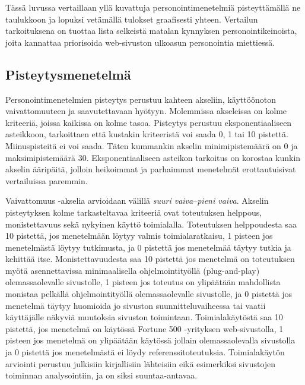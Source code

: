 \documentclass[finnish, 12pt, a4paper, elec, utf8, a-1b, online]{aaltothesis}
\begin{document}
Tässä luvussa vertaillaan yllä kuvattuja personointimenetelmiä pisteyttämällä ne
taulukkoon ja lopuksi vetämällä tulokset graafisesti yhteen. Vertailun
tarkoituksena on tuottaa lista selkeistä matalan kynnyksen personointikeinoista,
joita kannattaa priorisoida web-sivuston ulkoasun personointia miettiessä.

\subsection{Pisteytysmenetelmä}

Personointimenetelmien pisteytys perustuu kahteen akseliin, käyttöönoton
vaivattomuuteen ja saavutettavaan hyötyyn. Molemmissa akseleissa on kolme
kriteeriä, joissa kaikissa on kolme tasoa. Pisteytys perustuu eksponentiaaliseen
asteikkoon, tarkoittaen että kustakin kriteeristä voi saada 0, 1 tai 10
pistettä. Miinuspisteitä ei voi saada. Täten kummankin akselin minimipistemäärä
on 0 ja maksimipistemäärä 30. Eksponentiaaliseen asteikon tarkoitus on korostaa
kunkin akselin ääripäitä, jolloin heikoimmat ja parhaimmat menetelmät
erottautuisivat vertailuissa paremmin.

Vaivattomuus -akselia arvioidaan välillä \textit{suuri vaiva}--\textit{pieni
    vaiva}. Akselin pisteytyksen kolme tarkasteltavaa kriteeriä ovat toteutuksen
helppous, monistettavuus sekä nykyinen käyttö toimialalla. Toteutuksen
helppoudesta saa 10 pistettä, jos menetelmään löytyy valmis toimialaratkaisu, 1
pisteen jos menetelmästä löytyy tutkimusta, ja 0 pistettä jos menetelmää täytyy
tutkia ja kehittää itse. Monistettavuudesta saa 10 pistettä jos menetelmä on
toteutuksen myötä asennettavissa minimaalisella ohjelmointityöllä
(plug-and-play) olemassaolevalle sivustolle, 1 pisteen jos toteutus on
ylipäätään mahdollista monistaa pelkällä ohjelmointityöllä olemassaolevalle
sivustolle, ja 0 pistettä jos menetelmä täytyy huomioida jo sivuston
suunnitteluvaiheessa tai vaatii käyttäjälle näkyviä muutoksia sivuston
toimintaan. Toimialakäytöstä saa 10 pistettä, jos menetelmä on käytössä Fortune
500 -yrityksen web-sivustolla, 1 pisteen jos menetelmä on ylipäätään käytössä
jollain olemassaolevalla sivustolla ja 0 pistettä jos menetelmästä ei löydy
referenssitoteutuksia. Toimialakäytön arviointi perustuu julkisiin kirjallisiin
lähteisiin eikä esimerkiksi sivustojen toiminnan analysointiin, ja on siksi
suuntaa-antavaa.
\end{document}
